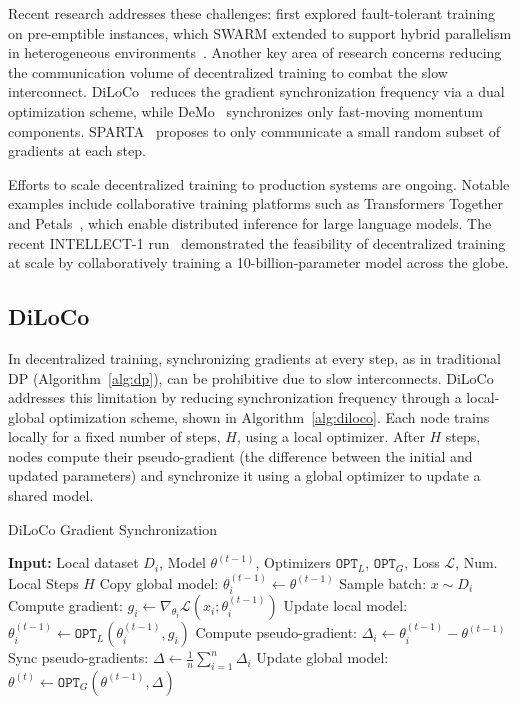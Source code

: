 \documentclass{article}
\begin{document}
Recent research addresses these challenges: \citeauthor{zhang2020volatileinstances} first explored fault-tolerant training on pre-emptible instances, which SWARM extended to support hybrid parallelism in heterogeneous environments~\cite{ryabinin2023swarm}. Another key area of research concerns reducing the communication volume of decentralized training to combat the slow interconnect. DiLoCo~\cite{douillard2023diloco} reduces the gradient synchronization frequency via a dual optimization scheme, while DeMo~\cite{peng2024demo} synchronizes only fast-moving momentum components. SPARTA~\cite{exo2025sparta} proposes to only communicate a small random subset of gradients at each step.

Efforts to scale decentralized training to production systems are ongoing. Notable examples include collaborative training platforms such as Transformers Together~\cite{diskin2021collaborativelearning} and Petals~\cite{borzunov2023petals}, which enable distributed inference for large language models. The recent INTELLECT-1 run~\cite{jaghouar2024intellect1} demonstrated the feasibility of decentralized training at scale by collaboratively training a 10-billion-parameter model across the globe.

\subsection{DiLoCo}

In decentralized training, synchronizing gradients at every step, as in traditional DP (Algorithm~\ref{alg:dp}), can be prohibitive due to slow interconnects. DiLoCo~\cite{douillard2023diloco} addresses this limitation by reducing synchronization frequency through a local-global optimization scheme, shown in Algorithm~\ref{alg:diloco}. Each node trains locally for a fixed number of steps, $H$, using a local optimizer. After $H$ steps, nodes compute their pseudo-gradient (the difference between the initial and updated parameters) and synchronize it using a global optimizer to update a shared model.

\begin{algorithm}
\caption{DiLoCo Gradient Synchronization}
\label{alg:diloco}
\begin{algorithmic}
\State \textbf{Input:} Local dataset $D_i$, Model $\theta^{(t-1)}$, Optimizers $\mathtt{OPT}_L$, $\mathtt{OPT}_G$, Loss $\mathcal{L}$, Num. Local Steps $H$ 
\State Copy global model: $\theta_i^{(t-1)} \gets \theta^{(t-1)}$
  \State Sample batch: $x \sim D_i$
  \State Compute gradient: $g_i \gets \nabla_{\theta_i} \mathcal{L}(x_i; \theta_i^{(t-1)})$
  \State Update local model: $\theta_i^{(t-1)} \gets \mathtt{OPT}_L(\theta_i^{(t-1)}, g_i)$
\EndFor
\State Compute pseudo-gradient: $\Delta_i \gets \theta_i^{(t-1)} - \theta^{(t-1)}$
\State Sync pseudo-gradients: $\Delta \gets \frac{1}{n} \sum_{i=1}^n \Delta_i$ 
\State Update global model: $\theta^{(t)} \gets \mathtt{OPT}_G(\theta^{(t-1)}, \Delta)$
\end{algorithmic}
\end{algorithm}
\end{document}
